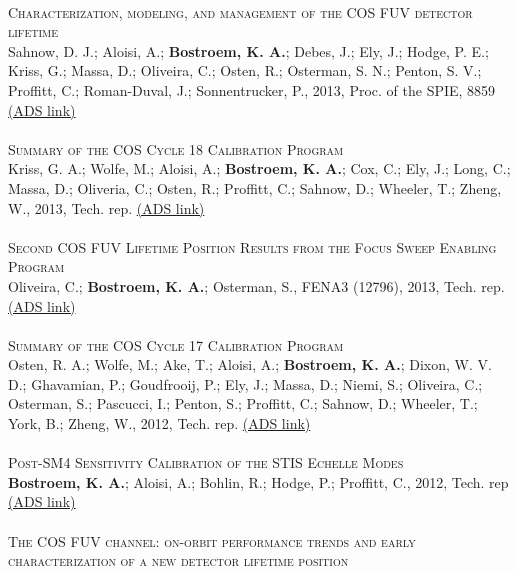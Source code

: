 \\
\textsc{Characterization, modeling, and management of the COS FUV detector lifetime}\\ 
Sahnow, D. J.; Aloisi, A.; \textbf{Bostroem, K. A.}; Debes, J.; Ely, J.; Hodge, P. E.; Kriss, G.; Massa, D.; Oliveira, C.; Osten, R.; Osterman, S. N.; Penton, S. V.; Proffitt, C.; Roman-Duval, J.; Sonnentrucker, P., 2013, Proc. of the SPIE, 8859 
\color{blue}\href{https://ui.adsabs.harvard.edu/#abs/2013SPIE.8859E..0SS/abstract}{(ADS link)}\color{black}\\
\\
\textsc{Summary of the COS Cycle 18 Calibration Program}\\ 
Kriss, G. A.; Wolfe, M.; Aloisi, A.; \textbf{Bostroem, K. A.}; Cox, C.; Ely, J.; Long, C.; Massa, D.; Oliveria, C.; Osten, R.; Proffitt, C.; Sahnow, D.; Wheeler, T.; Zheng, W., 2013, Tech. rep. 
\color{blue}\href{https://ui.adsabs.harvard.edu/#abs/2013cos..rept....4K/abstract}{(ADS link)}\color{black}\\ %
\\
\textsc{Second COS FUV Lifetime Position Results from the Focus Sweep Enabling Program}\\ 
Oliveira, C.; \textbf{Bostroem, K. A.}; Osterman, S., FENA3 (12796), 2013, Tech. rep. 
\color{blue}\href{https://ui.adsabs.harvard.edu/#abs/2013cos..rept....1O/abstract}{(ADS link)}\color{black}\\ %
\\
\textsc{Summary of the COS Cycle 17 Calibration Program}\\ 
Osten, R. A.; Wolfe, M.; Ake, T.; Aloisi, A.; \textbf{Bostroem, K. A.}; Dixon, W. V. D.; Ghavamian, P.; Goudfrooij, P.; Ely, J.; Massa, D.; Niemi, S.; Oliveira, C.; Osterman, S.; Pascucci, I.; Penton, S.; Proffitt, C.; Sahnow, D.; Wheeler, T.; York, B.; Zheng, W., 2012, Tech. rep. 
\color{blue}\href{https://ui.adsabs.harvard.edu/#abs/2012cos..rept....2O/abstract}{(ADS link)}\color{black}\\ %
\\
\textsc{Post-SM4 Sensitivity Calibration of the STIS Echelle Modes}\\ 
{\bf Bostroem, K. A.}; Aloisi, A.; Bohlin, R.; Hodge, P.; Proffitt, C., 2012, Tech. rep 
\color{blue}\href{https://ui.adsabs.harvard.edu/#abs/2012stis.rept....1B/abstract}{(ADS link)}\color{black}\\%
\\
\textsc{The COS FUV channel: on-orbit performance trends and early characterization of a new detector lifetime position}\\ 
